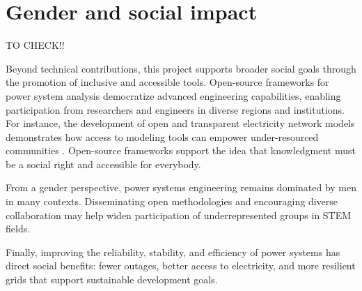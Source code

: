 \section{Gender and social impact}

TO CHECK!!

Beyond technical contributions, this project supports broader social goals through the promotion of inclusive and accessible tools. 
Open-source frameworks for power system analysis democratize advanced engineering capabilities, enabling participation from researchers 
and engineers in diverse regions and institutions. For instance, the development of open and transparent electricity network 
models demonstrates how access to modeling tools can empower under-resourced communities \cite{KirliPyPSA2021}. Open-source frameworks
support the idea that knowledgment must be a social right and accessible for everybody.

From a gender perspective, power systems engineering remains dominated by men in many contexts. Disseminating open methodologies 
and encouraging diverse collaboration may help widen participation of underrepresented groups in STEM fields. 

Finally, improving the reliability, stability, and efficiency of power systems has direct social benefits: fewer outages, better access to electricity, 
and more resilient grids that support sustainable development goals.  


